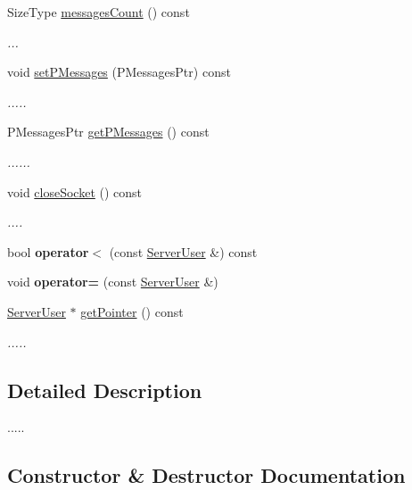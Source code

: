 \begin{DoxyCompactItemize}
Size\+Type \hyperlink{classServerUser_aaa586562b5a35b39c187728f32c36dae}{messages\+Count} () const 
\begin{DoxyCompactList}\small\item\em ... \end{DoxyCompactList}\item 
void \hyperlink{classServerUser_ae6cf777a460e07d563b4e14ef9baf131}{set\+P\+Messages} (P\+Messages\+Ptr) const 
\begin{DoxyCompactList}\small\item\em ..... \end{DoxyCompactList}\item 
P\+Messages\+Ptr \hyperlink{classServerUser_ac6a83ceae296cebeba44b83e93050a53}{get\+P\+Messages} () const 
\begin{DoxyCompactList}\small\item\em ...... \end{DoxyCompactList}\item 
void \hyperlink{classServerUser_a922bc75b62a9eeeab0c5bb4433f8a34e}{close\+Socket} () const 
\begin{DoxyCompactList}\small\item\em .... \end{DoxyCompactList}\item 
bool {\bfseries operator$<$} (const \hyperlink{classServerUser}{Server\+User} \&) const \hypertarget{classServerUser_adb3605ca08c5cf0ffe6dcfb3d108f744}{}\label{classServerUser_adb3605ca08c5cf0ffe6dcfb3d108f744}

\item 
void {\bfseries operator=} (const \hyperlink{classServerUser}{Server\+User} \&)\hypertarget{classServerUser_a2a52373517ea958408232ab06ff8610f}{}\label{classServerUser_a2a52373517ea958408232ab06ff8610f}

\item 
\hyperlink{classServerUser}{Server\+User} $\ast$ \hyperlink{classServerUser_ae6eb28131e727129e8797117a1a4421d}{get\+Pointer} () const 
\begin{DoxyCompactList}\small\item\em ..... \end{DoxyCompactList}\end{DoxyCompactItemize}


\subsection{Detailed Description}
..... 

\subsection{Constructor \& Destructor Documentation}
